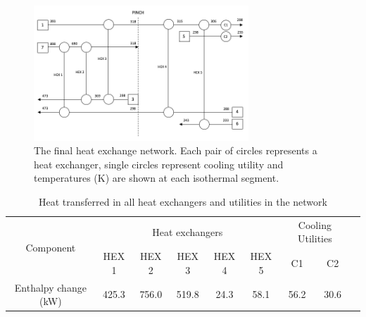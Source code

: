 \documentclass[11pt, oneside]{article}
\begin{document}
\begin{figure} [H]
\centering
\includegraphics[width=0.72\textwidth]{./pictures/heatexnetwork.png}
  \caption{The final heat exchange network. Each pair of circles represents a heat exchanger, single circles represent cooling utility and temperatures (K) are shown at each isothermal segment.} \label{fig:heatexnetwork}
  \end{figure}

\begin {table} [h]
\begin{center}
\caption{Heat transferred in all heat exchangers and utilities in the network} \label{tab:powerhex} 
\begin{tabular}{ |c|c|c|c|c|c|c|c|c| }
 \hline
\multirow{2}{*}{Component} & \multicolumn{5}{|c|}{Heat exchangers }& \multicolumn{2}{|c|}{Cooling Utilities}\\ 
 \cline{2-8}
   & HEX 1 & HEX 2 & HEX 3 & HEX 4 &HEX 5 & C1 & C2\\ 
 \hline
 Enthalpy change (kW) & 425.3 & 756.0 & 519.8 & 24.3 & 58.1 & 56.2 & 30.6\\ 
 \hline
\end{tabular}
\end{center}  
\end {table}
\end{document}
